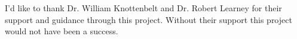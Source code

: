 \abstract

\thispagestyle{plain}
\setcounter{page}{2}

I'd like to thank Dr. William Knottenbelt and Dr. Robert Learney for their support and guidance through this project. Without their support this project would not have been a success.
